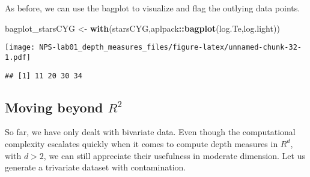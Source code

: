 \documentclass[
]{article}
\newenvironment{Shaded}{\begin{snugshade}}{\end{snugshade}}
\newcommand{\ControlFlowTok}[1]{\textcolor[rgb]{0.13,0.29,0.53}{\textbf{#1}}}
\newcommand{\DecValTok}[1]{\textcolor[rgb]{0.00,0.00,0.81}{#1}}
\newcommand{\FunctionTok}[1]{\textcolor[rgb]{0.13,0.29,0.53}{\textbf{#1}}}
\newcommand{\NormalTok}[1]{#1}
\newcommand{\OtherTok}[1]{\textcolor[rgb]{0.56,0.35,0.01}{#1}}
\newcommand{\SpecialCharTok}[1]{\textcolor[rgb]{0.81,0.36,0.00}{\textbf{#1}}}
\begin{document}
As before, we can use the bagplot to visualize and flag the outlying
data points.

\begin{Shaded}
\begin{Highlighting}[]
\NormalTok{bagplot\_starsCYG }\OtherTok{\textless{}{-}} \FunctionTok{with}\NormalTok{(starsCYG,aplpack}\SpecialCharTok{::}\FunctionTok{bagplot}\NormalTok{(log.Te,log.light))}
\end{Highlighting}
\end{Shaded}

\texttt{[image: NPS-lab01\_depth\_measures\_files/figure-latex/unnamed-chunk-32-1.pdf]}

\begin{Shaded}
\end{Shaded}

\begin{verbatim}
## [1] 11 20 30 34
\end{verbatim}

\hypertarget{moving-beyond-r-2}{%
\subsection{\texorpdfstring{Moving beyond
\(R ^2\)}{Moving beyond R \^{}2}}\label{moving-beyond-r-2}}

So far, we have only dealt with bivariate data. Even though the
computational complexity escalates quickly when it comes to compute
depth measures in \(R ^d\), with \(d>2\), we can still appreciate their
usefulness in moderate dimension. Let us generate a trivariate dataset
with contamination.
\end{document}
